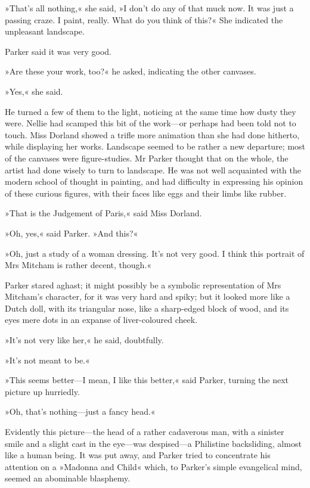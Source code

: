 »That's all nothing,« she said, »I don't do any of that muck now. It was just a passing craze. I paint, really. What do you think of this?« She indicated the unpleasant landscape.

Parker said it was very good.

»Are these your work, too?« he asked, indicating the other canvases.

»Yes,« she said.

He turned a few of them to the light, noticing at the same time how dusty they were. Nellie had scamped this bit of the work\allowbreak---\allowbreak or perhaps had been told not to touch. Miss Dorland showed a trifle more animation than she had done hitherto, while displaying her works. Landscape seemed to be rather a new departure; most of the canvases were figure-studies. Mr Parker thought that on the whole, the artist had done wisely to turn to landscape. He was not well acquainted with the modern school of thought in painting, and had difficulty in expressing his opinion of these curious figures, with their faces like eggs and their limbs like rubber.

»That is the Judgement of Paris,« said Miss Dorland.

»Oh, yes,« said Parker. »And this?«

»Oh, just a study of a woman dressing. It's not very good. I think this portrait of Mrs Mitcham is rather decent, though.«

Parker stared aghast; it might possibly be a symbolic representation of Mrs Mitcham's character, for it was very hard and spiky; but it looked more like a Dutch doll, with its triangular nose, like a sharp-edged block of wood, and its eyes mere dots in an expanse of liver-coloured cheek.

»It's not very like her,« he said, doubtfully.

»It's not meant to be.«

»This seems better\allowbreak---\allowbreak I mean, I like this better,« said Parker, turning the next picture up hurriedly.

»Oh, that's nothing\allowbreak---\allowbreak just a fancy head.«

Evidently this picture\allowbreak---\allowbreak the head of a rather cadaverous man, with a sinister smile and a slight cast in the eye\allowbreak---\allowbreak was despised\allowbreak---\allowbreak a Philistine backsliding, almost like a human being. It was put away, and Parker tried to concentrate his attention on a »Madonna and Child« which, to Parker's simple evangelical mind, seemed an abominable blasphemy.


